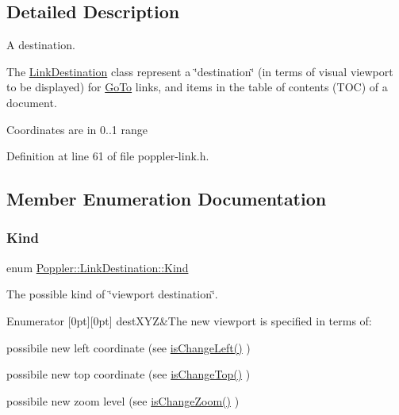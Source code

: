 \subsection{Detailed Description}
A destination. 

The \hyperlink{class_poppler_1_1_link_destination}{Link\+Destination} class represent a \char`\"{}destination\char`\"{} (in terms of visual viewport to be displayed) for \hyperlink{class_poppler_1_1_link_goto}{Go\+To} links, and items in the table of contents (T\+OC) of a document.

Coordinates are in 0..1 range 

Definition at line 61 of file poppler-\/link.\+h.



\subsection{Member Enumeration Documentation}
\mbox{\label{class_poppler_1_1_link_destination_a97a2b266fbd0c48fc0189269b9941810}} 
\subsubsection{\texorpdfstring{Kind}{Kind}}
{\footnotesize\ttfamily enum \hyperlink{class_poppler_1_1_link_destination_a97a2b266fbd0c48fc0189269b9941810}{Poppler\+::\+Link\+Destination\+::\+Kind}}

The possible kind of \char`\"{}viewport destination\char`\"{}. \begin{DoxyEnumFields}{Enumerator}
[0pt][0pt]{}\mbox{\label{class_poppler_1_1_link_destination_a97a2b266fbd0c48fc0189269b9941810af45093b1c3d3a5e52c779416d62934f5}} 
dest\+X\+YZ&The new viewport is specified in terms of\+:
\begin{DoxyItemize}
\item possibile new left coordinate (see \hyperlink{class_poppler_1_1_link_destination_a523f8bfa4ae35647d2c00f14ca6bca5f}{is\+Change\+Left()} )
\item possibile new top coordinate (see \hyperlink{class_poppler_1_1_link_destination_a477b631b2f1c8bb36813ff49776d331f}{is\+Change\+Top()} )
\item possibile new zoom level (see \hyperlink{class_poppler_1_1_link_destination_ac370c7a2833099390ee4054c02a4b84f}{is\+Change\+Zoom()} ) 
\end{DoxyItemize}\\
\hline

\end{DoxyEnumFields}


